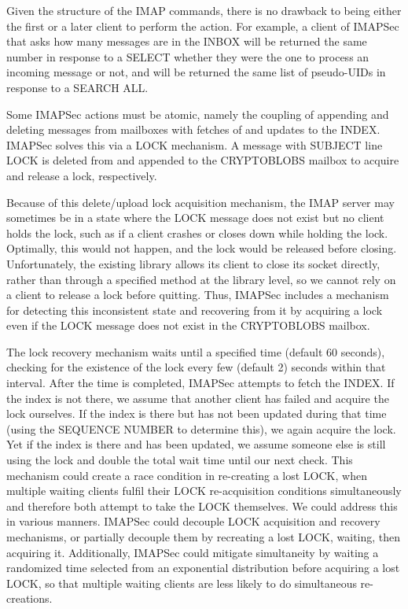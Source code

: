 \documentclass[pageno]{jpaper}
\newcommand{\project}{IMAPSec }
\begin{document}
Given the structure of the IMAP commands, there is no drawback to being either the first or a later client to perform the action. For example, a client of \project that asks how many messages are in the INBOX will be returned the same number in response to a SELECT whether they were the one to process an incoming message or not, and will be returned the same list of pseudo-UIDs in response to a SEARCH ALL.

Some \project actions must be atomic, namely the coupling of appending and deleting messages from mailboxes with fetches of and updates to the INDEX. \project solves this via a LOCK mechanism. A message with SUBJECT line LOCK is deleted from and appended to the CRYPTOBLOBS mailbox to acquire and release a lock, respectively.

Because of this delete/upload lock acquisition mechanism, the IMAP server may sometimes be in a state where the LOCK message does not exist but no client holds the lock, such as if a client crashes or closes down while holding the lock. Optimally, this would not happen, and the lock would be released before closing. Unfortunately, the existing library allows its client to close its socket directly, rather than through a specified method at the library level, so we cannot rely on a client to release a lock before quitting. Thus, \project includes a mechanism for detecting this inconsistent state and recovering from it by acquiring a lock even if the LOCK message does not exist in the CRYPTOBLOBS mailbox.

The lock recovery mechanism waits until a specified time (default 60 seconds), checking for the existence of the lock every few (default 2) seconds within that interval. After the time is completed, \project attempts to fetch the INDEX. If the index is not there, we assume that another client has failed and acquire the lock ourselves. If the index is there but has not been updated during that time (using the SEQUENCE NUMBER to determine this), we again acquire the lock. Yet if the index is there and has been updated, we assume someone else is still using the lock and double the total wait time until our next check. This mechanism could create a race condition in re-creating a lost LOCK, when multiple waiting clients fulfil their LOCK re-acquisition conditions simultaneously and therefore both attempt to take the LOCK themselves. We could address this in various manners. \project could decouple LOCK acquisition and recovery mechanisms, or partially decouple them by recreating a lost LOCK, waiting, then acquiring it. Additionally, \project could mitigate simultaneity by waiting a randomized time selected from an exponential distribution before acquiring a lost LOCK, so that multiple waiting clients are less likely to do simultaneous re-creations.
\end{document}
